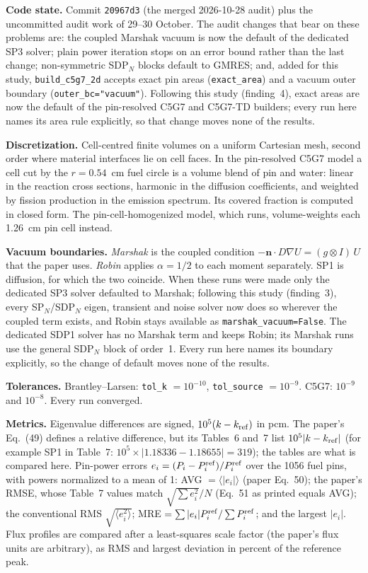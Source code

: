 \documentclass[a4paper,10pt]{article}
\newcommand{\code}[1]{\texttt{#1}}
\begin{document}
\textbf{Code state.} Commit \code{20967d3} (the merged 2026-10-28 audit)
plus the uncommitted audit work of 29--30 October. The audit changes that
bear on these problems are: the coupled Marshak vacuum is now the default of
the dedicated SP3 solver; plain power iteration stops on an error bound
rather than the last change; non-symmetric SDP$_N$ blocks default to GMRES;
and, added for this study, \code{build\_c5g7\_2d} accepts exact pin areas
(\code{exact\_area}) and a vacuum outer boundary (\code{outer\_bc="vacuum"}).
Following this study (finding~4), exact areas are now the default of the
pin-resolved C5G7 and C5G7-TD builders; every run here names its area rule
explicitly, so that change moves none of the results.

\textbf{Discretization.} Cell-centred finite volumes on a uniform Cartesian
mesh, second order where material interfaces lie on cell faces. In the
pin-resolved C5G7 model a cell cut by the $r = 0.54$~cm fuel circle is a
volume blend of pin and water: linear in the reaction cross sections,
harmonic in the diffusion coefficients, and weighted by fission production
in the emission spectrum. Its covered fraction is computed in closed form.
The pin-cell-homogenized model, which 
runs, volume-weights each 1.26~cm pin cell instead.

\textbf{Vacuum boundaries.} \emph{Marshak} is the coupled condition
$-\mathbf{n}\cdot D\nabla U = (g \otimes I)\,U$ that the paper uses.
\emph{Robin} applies $\alpha = 1/2$ to each moment separately. SP1 is
diffusion, for which the two coincide. When these runs were made only the
dedicated SP3 solver defaulted to Marshak; following this study (finding~3),
every SP$_N$/SDP$_N$ eigen, transient and noise solver now does so wherever
the coupled term exists, and Robin stays available as
\code{marshak\_vacuum=False}. The dedicated SDP1 solver has no Marshak term
and keeps Robin; its Marshak runs use the general SDP$_N$ block of order~1.
Every run here names its boundary explicitly, so the change of default moves
none of the results.

\textbf{Tolerances.} Brantley--Larsen: \code{tol\_k} $= 10^{-10}$,
\code{tol\_source} $= 10^{-9}$. C5G7: $10^{-9}$ and $10^{-8}$. Every run
converged.

\textbf{Metrics.} Eigenvalue differences are signed,
$10^5 (k - k_{\rm ref})$ in pcm. The paper's Eq.~(49) defines a relative
difference, but its Tables~6 and~7 list $10^5 |k - k_{\rm ref}|$ (for
example SP1 in Table~7: $10^5 \times |1.18336 - 1.18655| = 319$); the
tables are what is compared here. Pin-power errors
$e_i = (P_i - P_i^{\rm ref})/P_i^{\rm ref}$ over the 1056 fuel pins, with
powers normalized to a mean of 1: AVG $= \langle |e_i| \rangle$ (paper
Eq.~50); the paper's RMSE, whose Table~7 values match
$\sqrt{\sum e_i^2}/N$ (Eq.~51 as printed equals AVG); the conventional RMS
$\sqrt{\langle e_i^2 \rangle}$; MRE $= \sum |e_i| P_i^{\rm ref} / \sum
P_i^{\rm ref}$; and the largest $|e_i|$. Flux profiles are compared after a
least-squares scale factor (the paper's flux units are arbitrary), as RMS and
largest deviation in percent of the reference peak.
\end{document}
